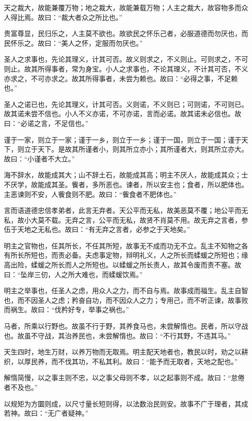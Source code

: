 \documentclass[]{article}
\begin{document}
天之裁大，故能兼覆万物；地之裁大，故能兼载万物；人主之裁大，故容物多而众人得比焉。故曰：``裁大者众之所比也。''

贵富尊显，民归乐之，人主莫不欲也。故欲民之怀乐己者，必服道德而勿厌也，而民怀乐之。故曰：``美人之怀，定服而勿厌也。''

圣人之求事也，先论其理义，计其可否。故义则求之，不义则止。可则求之，不可则止。故其所得事者，常为身宝。小人之求事也，不论其理义，不计其可否，不义亦求之，不可亦求之。故其所得事者，未尝为赖也。故曰：``必得之事，不足赖也。''

圣人之诺已也，先论其理义，计其可否。义则诺，不义则已；可则诺，不可则已。故其诺未尝不信也。小人不义亦诺，不可亦诺，言而必诺。故其诺未必信也。故曰：``必诺之言，不足信也。''

谨于一家，则立于一家；谨于一乡，则立于一乡；谨于一国，则立于一国；谨于天下，则立于天下。是故其所谨者小，则其所立亦小；其所谨者大，则其所立亦大。故曰：``小谨者不大立。''

海不辞水，故能成其大；山不辞土石，故能成其高；明主不厌人，故能成其众；士不厌学，故能成其圣。飺者，多所恶也。谏者，所以安主也；食者，所以肥体也。主恶谏则不安，人飺食则不肥。故曰：``飺食者不肥体也。''

言而语道德忠信孝弟者，此言无弃者。天公平而无私，故美恶莫不覆；地公平而无私，故小大莫不载。无弃之言，公平而无私，故贤不肖莫不用。故无弃之言者，参伍于天地之无私也。故曰：``有无弃之言者，必参之于天地矣。''

明主之官物也，任其所长，不任其所短，故事无不成而功无不立。乱主不知物之各有所长所短也，而责必备。夫虑事定物，辩明礼义，人之所长而蝚蝯之所短也；缘高出险，蝚蝯之所长而人之所短也。以蝚蝯之所长责人，故其令废而责不塞。故曰：``坠岸三仞，人之所大难也，而蝚蝯饮焉。''

明主之举事也，任圣人之虑，用众人之力，而不自与焉。故事成而福生。乱主自智也，而不因圣人之虑；矜奋自功，而不因众人之力；专用己，而不听正谏，故事败而祸生。故曰：``伐矜好专，举事之祸也。''

马者，所乘以行野也。故虽不行于野，其养食马也，未尝解惰也。民者，所以守战也。故虽不守战，其治养民也，未尝解惰也。故曰：``不行其野，不违其马。''

天生四时，地生万财，以养万物而无取焉。明主配天地者也，教民以时，劝之以耕织，以厚民养，而不伐其功，不私其利。故曰：``能予而无取者，天地之配也。''

解惰简慢，以之事主则不忠，以之事父母则不孝，以之起事则不成。故曰：``怠倦者不及也。''

以规矩为方圜则成，以尺寸量长短则得，以法数治民则安。故事不广于理者，其成若神。故曰：``无广者疑神。''
\end{document}
